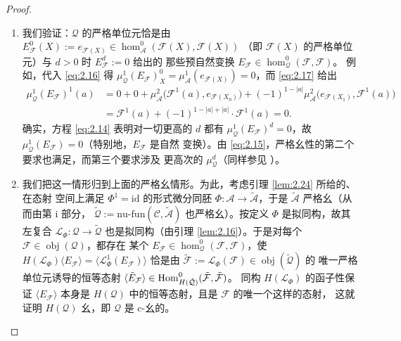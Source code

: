 \begin{proof}
\begin{enumerate}
  \item 我们验证：$\mathcal Q$ 的严格单位元恰是由 $E^0_{\mathcal F}(X):=
        e_{\mathcal F(X)}\in\hom^0_{\mathcal A}(\mathcal F(X),\mathcal F(X))$
        （即 $\mathcal F(X)$ 的严格单位元）与 $d>0$ 时 $E^d_{\mathcal F}:=0$ 给出的
        那些预自然变换 $E_{\mathcal F}\in\hom^0_{\mathcal Q}(\mathcal F,\mathcal F)$。
        例如，代入 \eqref{eq:2.16} 得 $\mu^1_{\mathcal Q}(E_{\mathcal F})^0_X=
        \mu^1_{\mathcal A}(e_{\mathcal F(X)})=0$，而 \eqref{eq:2.17} 给出
        \[
          \begin{aligned}
            \mu^1_{\mathcal Q}(E_{\mathcal F})^1(a)
            &=0+0+\mu^2_{\mathcal A}\bigl(\mathcal F^1(a),e_{\mathcal F(X_0)}\bigr)
            +(-1)^{1-|a|}\mu^2_{\mathcal A}\bigl(e_{\mathcal F(X_1)},\mathcal F^1(a)
            \bigr)\\
            &=\mathcal F^1(a)+(-1)^{1-|a|+|a|}\cdot\mathcal F^1(a)=0.
          \end{aligned}
        \]
        确实，方程 \eqref{eq:2.14} 表明对一切更高的 $d$ 都有
        $\mu^1_{\mathcal Q}(E_{\mathcal F})^d=0$，故
        $\mu^1_{\mathcal Q}(E_{\mathcal F})=0$（特别地，$E_{\mathcal F}$ 是自然
        变换）。由 \eqref{eq:2.15}，严格幺性的第二个要求也满足，而第三个要求涉及
        更高次的 $\mu^d_{\mathcal Q}$（同样参见 \cite{Fuk99}）。
  \item 我们把这一情形归到上面的严格幺情形。为此，考虑引理 \ref{lem:2.24} 所给的、在态射
        空间上满足 $\Phi^1=\mathrm{id}$ 的形式微分同胚 $\Phi:\mathcal A\to
        \tilde{\mathcal A}$，于是 $\tilde{\mathcal A}$ 严格幺（从而由第 i 部分，
        $\tilde{\mathcal Q}:=\mathrm{nu\text{-}fun}(\mathcal C,\tilde{\mathcal A})$
        也严格幺）。按定义 $\Phi$ 是拟同构，故其左复合
        $\mathcal L_{\Phi}:\mathcal Q\to\tilde{\mathcal Q}$ 也是拟同构（由引理 \ref{lem:2.16}）。于是对每个 $\mathcal F\in\operatorname{obj}(\mathcal Q)$，都存在
        某个 $E_{\mathcal F}\in\hom^0_{\mathcal Q}(\mathcal F,\mathcal F)$，使
        $H(\mathcal L_{\Phi})\langle E_{\mathcal F}\rangle=\langle\mathcal L^1
        _{\Phi}(E_{\mathcal F})\rangle$ 恰是由 $\tilde{\mathcal F}:=
        \mathcal L_{\Phi}(\mathcal F)\in\operatorname{obj}(\tilde{\mathcal Q})$ 的
        唯一严格单位元诱导的恒等态射 $\langle\tilde E_{\mathcal F}\rangle\in
        \operatorname{Hom}^0_{H(\tilde{\mathcal Q})}(\tilde{\mathcal F},\tilde{\mathcal F})$。
        同构 $H(\mathcal L_{\Phi})$ 的函子性保证 $\langle E_{\mathcal F}\rangle$
        本身是 $H(\mathcal Q)$ 中的恒等态射，且是 $\mathcal F$ 的唯一个这样的态射，
        这就证明 $H(\mathcal Q)$ 幺，即 $\mathcal Q$ 是 c-幺的。
\end{enumerate}


\end{proof}
